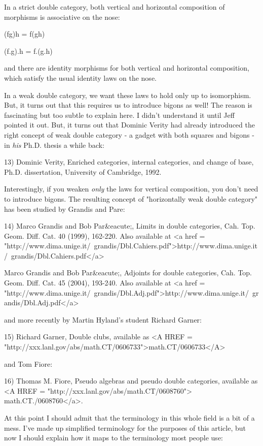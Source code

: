 In a strict double category, both vertical and horizontal composition 
of morphisms is associative on the nose:

(fg)h = f(gh)             

(f.g).h = f.(g.h)

and there are identity morphisms for both vertical and horizontal 
composition, which satisfy the usual identity laws on the nose.

In a weak double category, we want these laws to hold only up to 
isomorphism.  But, it turns out that this requires us to introduce
bigons as well!  The reason is fascinating but too subtle to explain
here.  I didn't understand it until Jeff pointed it out.  But, it 
turns out that Dominic Verity had already introduced the right concept 
of weak double category - a gadget with both squares and bigons - in 
\emph{his} Ph.D. thesis a while back:

13) Dominic Verity, Enriched categories, internal categories, and
change of base, Ph.D. dissertation, University of Cambridge, 1992.

Interestingly, if you weaken \emph{only} the laws for vertical
composition, you don't need to introduce bigons.  The resulting
concept of "horizontally weak double category" has been
studied by Grandis and Pare:

14) Marco Grandis and Bob Par&eacute;, Limits in double categories, Cah.
Top. Geom. Diff. Cat. 40 (1999), 162-220.  Also available at
<a href = "http://www.dima.unige.it/~grandis/Dbl.Cahiers.pdf">http://www.dima.unige.it/~grandis/Dbl.Cahiers.pdf</a>

Marco Grandis and Bob Par&eacute;, Adjoints for double categories, Cah. 
Top. Geom. Diff. Cat. 45 (2004), 193-240.  Also available at
<a href = "http://www.dima.unige.it/~grandis/Dbl.Adj.pdf">http://www.dima.unige.it/~grandis/Dbl.Adj.pdf</a>

and more recently by Martin Hyland's student Richard Garner:

15) Richard Garner, Double clubs, available as <A HREF =
"http://xxx.lanl.gov/abs/math.CT/0606733">math.CT/0606733</A>

and Tom Fiore:

16) Thomas M. Fiore, Pseudo algebras and pseudo double categories,
available as <A HREF = "http://xxx.lanl.gov/abs/math.CT/0608760">
math.CT./0608760</a>.

At this point I should admit that the terminology in this whole
field is a bit of a mess.  I've made up simplified terminology 
for the purposes of this article, but now I should explain how it
maps to the terminology most people use:


